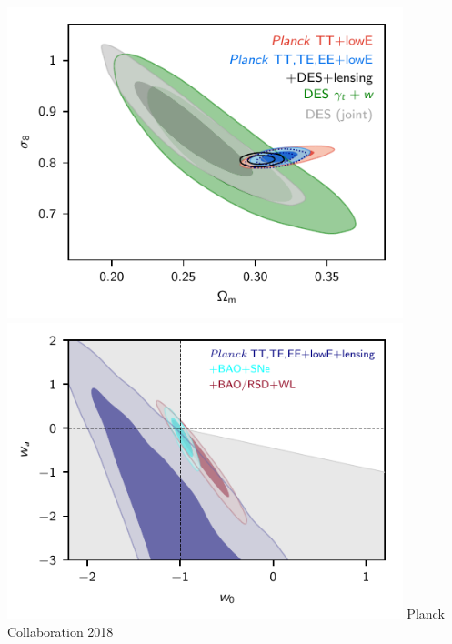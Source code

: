 \documentclass{beamer}
\begin{document}
{\begin{columns}
\begin{column}{0.5\textwidth}
\begin{itemize}
            \end{itemize}
        \end{column}
        \begin{column}{0.5\textwidth}    
                \includegraphics[width=0.9\textwidth]{DES-joint-s8-omm.pdf}
                \includegraphics[width=0.9\textwidth]{w0_wa.pdf}
                \newline
                {\tiny Planck Collaboration 2018}

        \end{column}
    \end{columns}
}
\end{document}
